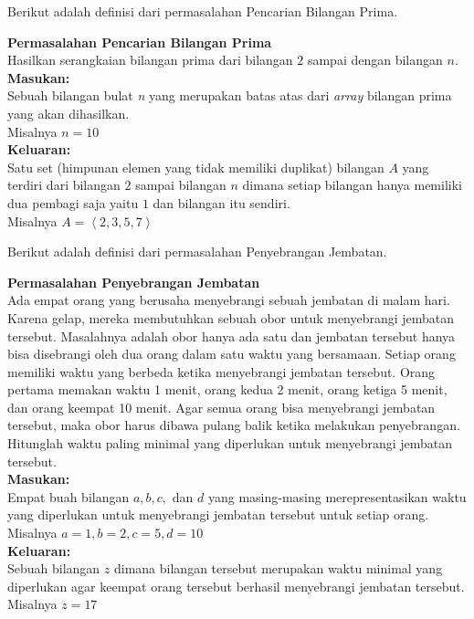Berikut adalah definisi dari permasalahan Pencarian Bilangan Prima.
\begin{contoh}
\label{cth:prima}
\textbf{Permasalahan Pencarian Bilangan Prima}\\
Hasilkan serangkaian bilangan prima dari bilangan $2$ sampai dengan bilangan $n$.\\  
\textbf{Masukan:}\\
Sebuah bilangan bulat \textit{n} yang merupakan batas atas dari \textit{array} bilangan prima yang akan dihasilkan.\\
Misalnya $n = 10$\\
\textbf{Keluaran:}\\
Satu set (himpunan elemen yang tidak memiliki duplikat) bilangan $A$ yang terdiri dari bilangan $2$ sampai bilangan $n$ dimana setiap bilangan hanya memiliki dua pembagi saja yaitu $1$ dan bilangan itu sendiri.\\
Misalnya $A = \left\langle 2,3,5,7 \right\rangle$\\
\end{contoh}
Berikut adalah definisi dari permasalahan Penyebrangan Jembatan.
\begin{contoh}
\textbf{Permasalahan Penyebrangan Jembatan}\\
Ada empat orang yang berusaha menyebrangi sebuah jembatan di malam hari. Karena gelap, mereka membutuhkan sebuah obor untuk menyebrangi jembatan tersebut. Masalahnya adalah obor hanya ada satu dan jembatan tersebut hanya bisa disebrangi oleh dua orang dalam satu waktu yang bersamaan. Setiap orang memiliki waktu yang berbeda ketika menyebrangi jembatan tersebut. Orang pertama memakan waktu 1 menit, orang kedua 2 menit, orang ketiga 5 menit, dan orang keempat 10 menit. 
Agar semua orang bisa menyebrangi jembatan tersebut, maka obor harus dibawa pulang balik ketika melakukan penyebrangan. Hitunglah waktu paling minimal yang diperlukan untuk menyebrangi jembatan tersebut.\\
\textbf{Masukan:}\\
Empat buah bilangan $a,b,c,$ dan $d$ yang masing-masing merepresentasikan waktu yang diperlukan untuk menyebrangi jembatan tersebut untuk setiap orang.\\
Misalnya $a = 1, b = 2, c = 5, d = 10$\\
\textbf{Keluaran:}\\
Sebuah bilangan $z$ dimana bilangan tersebut merupakan waktu minimal yang diperlukan agar keempat orang tersebut berhasil menyebrangi jembatan tersebut.\\
Misalnya $z = 17$\\
\end{contoh}

